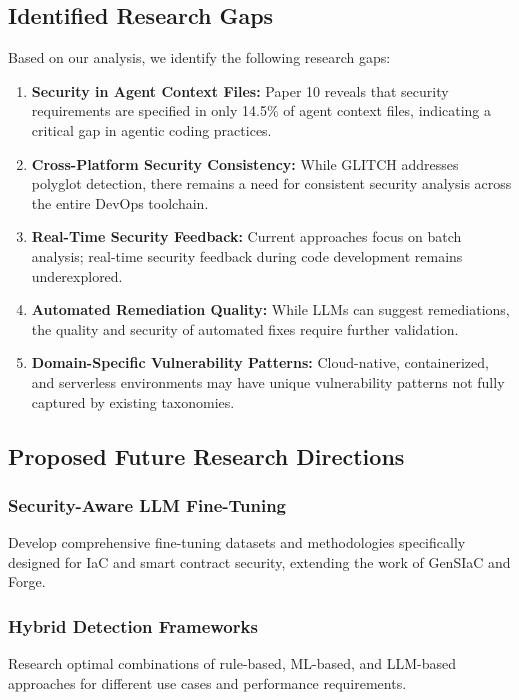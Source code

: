 \documentclass[11pt,a4paper]{article}
\begin{document}
\subsection{Identified Research Gaps}

Based on our analysis, we identify the following research gaps:

\begin{enumerate}
    \item \textbf{Security in Agent Context Files:} Paper 10 reveals that security requirements are specified in only 14.5\% of agent context files, indicating a critical gap in agentic coding practices.
    
    \item \textbf{Cross-Platform Security Consistency:} While GLITCH addresses polyglot detection, there remains a need for consistent security analysis across the entire DevOps toolchain.
    
    \item \textbf{Real-Time Security Feedback:} Current approaches focus on batch analysis; real-time security feedback during code development remains underexplored.
    
    \item \textbf{Automated Remediation Quality:} While LLMs can suggest remediations, the quality and security of automated fixes require further validation.
    
    \item \textbf{Domain-Specific Vulnerability Patterns:} Cloud-native, containerized, and serverless environments may have unique vulnerability patterns not fully captured by existing taxonomies.
\end{enumerate}

\subsection{Proposed Future Research Directions}

\subsubsection{Security-Aware LLM Fine-Tuning}
Develop comprehensive fine-tuning datasets and methodologies specifically designed for IaC and smart contract security, extending the work of GenSIaC and Forge.

\subsubsection{Hybrid Detection Frameworks}
Research optimal combinations of rule-based, ML-based, and LLM-based approaches for different use cases and performance requirements.
\end{document}
